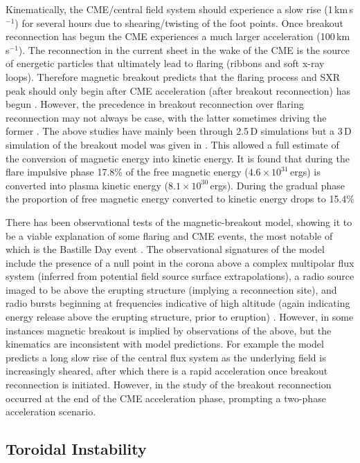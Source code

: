 Kinematically, the CME/central field system should experience a slow rise (1\,km\,s$^{-1}$) for several hours due to shearing/twisting of the foot points. Once breakout reconnection has begun the CME experiences a much larger acceleration (100\,km\,s$^{-1}$). The reconnection in the current sheet in the wake of the CME is the source of energetic particles that ultimately lead to flaring (ribbons and soft x-ray loops). Therefore magnetic breakout predicts that the flaring process and SXR peak should only begin after CME acceleration (after breakout reconnection) has begun \citep{lynch2004}. However, the precedence in breakout reconnection over flaring reconnection may not always be case, with the latter sometimes driving the former \citep{macneice2004}. The above studies have mainly been through 2.5\,D simulations but a 3\,D simulation of the breakout model was given in \citep{lynch2008}. This allowed a full estimate of the conversion of magnetic energy into kinetic energy. It is found that during the flare impulsive phase 17.8\% of the free magnetic energy ($4.6\times10^{31}$\,ergs) is converted into plasma kinetic energy ($8.1\times10^{30}$\,ergs). During the gradual phase the proportion of free magnetic energy converted to kinetic energy drops to 15.4\%

There has been observational tests of the magnetic-breakout model, showing it to be a viable explanation of some flaring and CME events, the most notable of which is the Bastille Day event \citep{aulan2000}. The observational signatures of the model include the presence of a null point in the corona above a complex multipolar flux system (inferred from potential field source surface extrapolations), a radio source imaged to be above the erupting structure (implying a reconnection site), and radio bursts beginning at frequencies indicative of high altitude (again indicating energy release above the erupting structure, prior to eruption) \citep{manoh2003}. However, in some instances magnetic breakout is implied by observations of the above, but the kinematics are inconsistent with model predictions. For example the model predicts a long slow rise of the central flux system as the underlying field is increasingly sheared, after which there is a rapid acceleration once breakout reconnection is initiated. However, in the study of \citet{bong2006} the breakout reconnection occurred at the end of the CME acceleration phase, prompting a two-phase acceleration scenario.


\subsection{Toroidal Instability}\label{sec:22}


